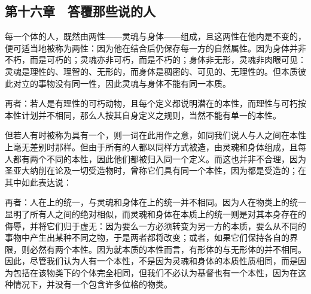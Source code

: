 
\subsection{第十六章　答覆那些说的人}

每一个体的人，既然由两性——灵魂与身体——组成，且这两性在他内是不变的，便可适当地被称为两性：因为他在结合后仍保存每一方的自然属性。因为身体并非不朽，而是可朽的；灵魂亦非可朽，而是不朽的；身体非无形，灵魂非肉眼可见：灵魂是理性的、理智的、无形的，而身体是稠密的、可见的、无理性的。但本质彼此对立的事物没有同一性，因此灵魂与身体不能有同一本质。\par

再者：若人是有理性的可朽动物，且每个定义都说明潜在的本性，而理性与可朽按本性计划并不相同，那么人按其自身定义之规则，当然不能有单一的本性。\par

但若人有时被称为具有一个，则一词在此用作之意，如同我们说人与人之间在本性上毫无差别时那样。但由于所有的人都以同样方式被造，由灵魂和身体组成，且每人都有两个不同的本性，因此他们都被归入同一个定义。而这也并非不合理，因为圣亚大纳削在论及一切受造物时，曾称它们具有同一个本性，因为都是受造的；在其中如此表达说：\par

再者：人在上的统一，与灵魂和身体在上的统一并不相同。因为人在物类上的统一显明了所有人之间的绝对相似，而灵魂和身体在本质上的统一则是对其本身存在的侮辱，并将它们归于虚无：因为要么一方必须转变为另一方的本质，要么从不同的事物中产生出某种不同之物，于是两者都将改变；或者，如果它们保持各自的界限，则必然有两个本性。因为就本质的本性而言，有形体的与无形体的并不相同。因此，尽管我们认为人有一个本性，不是因为灵魂和身体的本质性质相同，而是因为包括在该物类下的个体完全相同，但我们不必认为基督也有一个本性，因为在这种情况下，并没有一个包含许多位格的物类。\par


